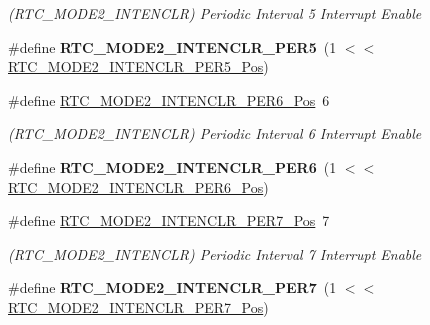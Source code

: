 \begin{DoxyCompactItemize}
\begin{DoxyCompactList}\small\item\em (R\+T\+C\+\_\+\+M\+O\+D\+E2\+\_\+\+I\+N\+T\+E\+N\+C\+L\+R) Periodic Interval 5 Interrupt Enable \end{DoxyCompactList}\item 
\hypertarget{group___s_a_m_l21___r_t_c_gab8f85ce07362df066e0fc03a4cdab83e}{}\#define {\bfseries R\+T\+C\+\_\+\+M\+O\+D\+E2\+\_\+\+I\+N\+T\+E\+N\+C\+L\+R\+\_\+\+P\+E\+R5}~(1 $<$$<$ \hyperlink{group___s_a_m_l21___r_t_c_ga4ce272eaec92f36333aabe830051e1d0}{R\+T\+C\+\_\+\+M\+O\+D\+E2\+\_\+\+I\+N\+T\+E\+N\+C\+L\+R\+\_\+\+P\+E\+R5\+\_\+\+Pos})\label{group___s_a_m_l21___r_t_c_gab8f85ce07362df066e0fc03a4cdab83e}

\item 
\hypertarget{group___s_a_m_l21___r_t_c_ga2911783762f4cf02229d336ba0f1f2ac}{}\#define \hyperlink{group___s_a_m_l21___r_t_c_ga2911783762f4cf02229d336ba0f1f2ac}{R\+T\+C\+\_\+\+M\+O\+D\+E2\+\_\+\+I\+N\+T\+E\+N\+C\+L\+R\+\_\+\+P\+E\+R6\+\_\+\+Pos}~6\label{group___s_a_m_l21___r_t_c_ga2911783762f4cf02229d336ba0f1f2ac}

\begin{DoxyCompactList}\small\item\em (R\+T\+C\+\_\+\+M\+O\+D\+E2\+\_\+\+I\+N\+T\+E\+N\+C\+L\+R) Periodic Interval 6 Interrupt Enable \end{DoxyCompactList}\item 
\hypertarget{group___s_a_m_l21___r_t_c_gac4c20fb196478934e0657c8c6826bafa}{}\#define {\bfseries R\+T\+C\+\_\+\+M\+O\+D\+E2\+\_\+\+I\+N\+T\+E\+N\+C\+L\+R\+\_\+\+P\+E\+R6}~(1 $<$$<$ \hyperlink{group___s_a_m_l21___r_t_c_ga2911783762f4cf02229d336ba0f1f2ac}{R\+T\+C\+\_\+\+M\+O\+D\+E2\+\_\+\+I\+N\+T\+E\+N\+C\+L\+R\+\_\+\+P\+E\+R6\+\_\+\+Pos})\label{group___s_a_m_l21___r_t_c_gac4c20fb196478934e0657c8c6826bafa}

\item 
\hypertarget{group___s_a_m_l21___r_t_c_gab0883866f2618b303025ca29a4b4c9cd}{}\#define \hyperlink{group___s_a_m_l21___r_t_c_gab0883866f2618b303025ca29a4b4c9cd}{R\+T\+C\+\_\+\+M\+O\+D\+E2\+\_\+\+I\+N\+T\+E\+N\+C\+L\+R\+\_\+\+P\+E\+R7\+\_\+\+Pos}~7\label{group___s_a_m_l21___r_t_c_gab0883866f2618b303025ca29a4b4c9cd}

\begin{DoxyCompactList}\small\item\em (R\+T\+C\+\_\+\+M\+O\+D\+E2\+\_\+\+I\+N\+T\+E\+N\+C\+L\+R) Periodic Interval 7 Interrupt Enable \end{DoxyCompactList}\item 
\hypertarget{group___s_a_m_l21___r_t_c_ga50a0640cc3b50ef8067134d05b8184a4}{}\#define {\bfseries R\+T\+C\+\_\+\+M\+O\+D\+E2\+\_\+\+I\+N\+T\+E\+N\+C\+L\+R\+\_\+\+P\+E\+R7}~(1 $<$$<$ \hyperlink{group___s_a_m_l21___r_t_c_gab0883866f2618b303025ca29a4b4c9cd}{R\+T\+C\+\_\+\+M\+O\+D\+E2\+\_\+\+I\+N\+T\+E\+N\+C\+L\+R\+\_\+\+P\+E\+R7\+\_\+\+Pos})\label{group___s_a_m_l21___r_t_c_ga50a0640cc3b50ef8067134d05b8184a4}


\end{DoxyCompactItemize}
